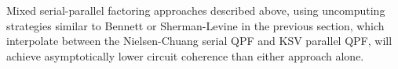 \begin{conjecture}
Mixed serial-parallel factoring approaches described above,
using uncomputing strategies similar to Bennett or
Sherman-Levine in the previous section,
which interpolate between the Nielsen-Chuang serial QPF and
KSV parallel QPF, will achieve asymptotically lower circuit
coherence than either approach alone.
\end{conjecture}

